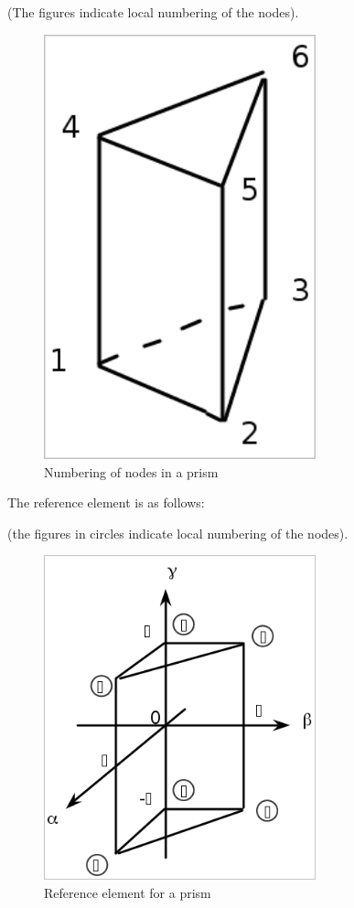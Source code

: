     (The figures indicate local numbering of the nodes).
\begin{figure}[H]%
\begin{center}
%
  \includegraphics[width=0.7\textwidth]{./graphics/prism-numbering}
%
\end{center}
\caption{Numbering of nodes in a prism}
\label{fig:prismnumbering}
\end{figure}

The reference element is as follows:

(the figures in circles indicate local numbering of the nodes).

\begin{figure}[H]%
\begin{center}
%
  \includegraphics[width=0.7\textwidth]{./graphics/prism}
%
\end{center}
\caption{Reference element for a prism}
\label{fig:prism}
\end{figure}

